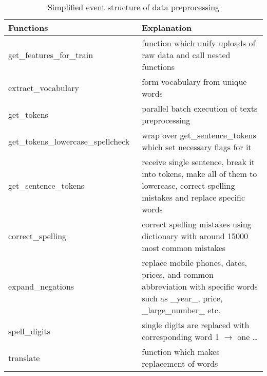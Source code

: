 \begin{table}[h]
	\centering
	\caption{Simplified event structure of data preprocessing}
	\label{my-label}
	\begin{tabular}{| p{7cm} | p{10cm} |}
		\hline
		\textbf{Functions}                                    & \textbf{Explanation}                                                                                                                \\ \hline
		get\_features\_for\_train                             & function which unify uploads of raw data and call nested functions                                                                   \\ \hline
		extract\_vocabulary                                   & form vocabulary from unique words                                                                                                   \\ \hline
		get\_tokens                                           & parallel batch execution of texts preprocessing 
		\\ \hline
		get\_tokens\_lowercase\_spellcheck\ & wrap over get\_sentence\_tokens which set necessary flags for it                                                                    \\ \hline
		get\_sentence\_tokens                                 & receive single sentence, break it into tokens, make all of them to lowercase, correct spelling mistakes and replace specific words \\ \hline
		correct\_spelling                                     & correct spelling mistakes using dictionary with around 15000 most common mistakes                                                   \\ \hline
		expand\_negations                                     & replace mobile phones, dates, prices, and common abbreviation with specific words such as \_year\_, price,  \_large\_number\_ etc.  \\ \hline
		spell\_digits                                         & single digits are replaced with corresponding word 1 $\rightarrow$ one …                                                                          \\ \hline
		translate                                             & function which makes replacement of words                                                                                           \\ \hline
	\end{tabular}
\end{table}



